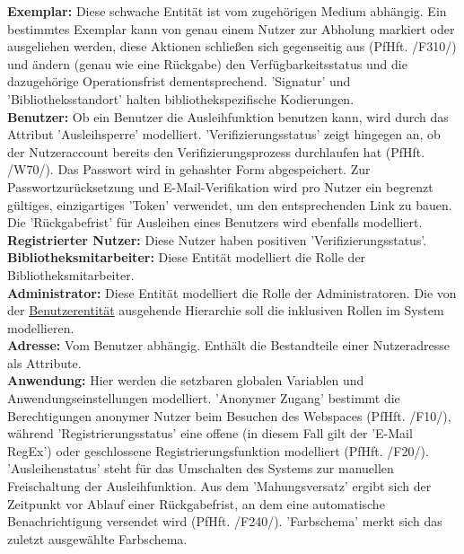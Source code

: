 \documentclass{article}
\begin{document}
\textbf{\hypertarget{Exemplarentität}{Exemplar}:} Diese schwache Entität ist vom zugehörigen Medium abhängig. Ein bestimmtes Exemplar kann von genau einem Nutzer zur Abholung markiert oder ausgeliehen werden, diese Aktionen schließen sich gegenseitig aus (PfHft. /F310/) und ändern (genau wie eine Rückgabe) den Verfügbarkeitsstatus und die dazugehörige Operationsfrist dementsprechend. 'Signatur' und 'Bibliotheksstandort' halten bibliothekspezifische Kodierungen. \\
\textbf{\hypertarget{Benutzerentität}{Benutzer}:} Ob ein Benutzer die Ausleihfunktion benutzen kann, wird durch das Attribut 'Ausleihsperre' modelliert. 'Verifizierungsstatus' zeigt hingegen an, ob der Nutzeraccount bereits den Verifizierungsprozess durchlaufen hat (PfHft. /W70/). Das Passwort wird in gehashter Form abgespeichert. Zur Passwortzurücksetzung und E-Mail-Verifikation wird pro Nutzer ein begrenzt gültiges, einzigartiges 'Token' verwendet, um den entsprechenden Link zu bauen. Die 'Rückgabefrist' für Ausleihen eines Benutzers wird ebenfalls modelliert.\\
\textbf{Registrierter Nutzer:} Diese Nutzer haben positiven 'Verifizierungsstatus'.\\
\textbf{Bibliotheksmitarbeiter:} Diese Entität modelliert die Rolle der Bibliotheksmitarbeiter.\\
\textbf{Administrator:} Diese Entität modelliert die Rolle der Administratoren. Die von der \hyperlink{Benutzerentität}{Benutzerentität} ausgehende Hierarchie soll die inklusiven Rollen im System modellieren.  \\
\textbf{Adresse:} Vom Benutzer abhängig. Enthält die Bestandteile einer Nutzeradresse als Attribute. \\
\textbf{Anwendung:} Hier werden die setzbaren globalen Variablen und Anwendungseinstellungen modelliert. 'Anonymer Zugang' bestimmt die Berechtigungen anonymer Nutzer beim Besuchen des Webspaces (PfHft. /F10/), während 'Registrierungsstatus' eine offene (in diesem Fall gilt der 'E-Mail RegEx') oder geschlossene Registrierungsfunktion modelliert (PfHft. /F20/). 'Ausleihenstatus' steht für das Umschalten des Systems zur manuellen Freischaltung der Ausleihfunktion. Aus dem 'Mahungsversatz' ergibt sich der Zeitpunkt vor Ablauf einer Rückgabefrist, an dem eine automatische Benachrichtigung versendet wird (PfHft. /F240/). \hypertarget{Farbschemaattribut}{'Farbschema'} merkt sich das zuletzt ausgewählte Farbschema. \\
\end{document}
